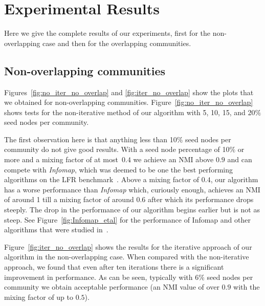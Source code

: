 \section{Experimental Results}
\newcommand{\appplotwidth}{\linewidth}
\newcommand{\appcfinderwidth}{\linewidth}

Here we give the complete results of our experiments, first for the non-overlapping case and then for the overlapping communities.

\subsection{Non-overlapping communities}
Figures~\ref{fig:no_iter_no_overlap} and \ref{fig:iter_no_overlap} %
show the plots that we obtained for non-overlapping communities. Figure~\ref{fig:no_iter_no_overlap}
shows tests for the non-iterative method of our algorithm with 5, 10, 15, and 20$\%$ seed nodes per 
community. 

The first observation here is that anything less than 10$\%$ seed nodes per community 
do not give good results. With a seed node percentage of 10$\%$ or more and 
a mixing factor of at most~$0.4$ we achieve an NMI above $0.9$ and can compete with \textit{Infomap}, 
which was deemed to be one the best performing algorithms on the LFR benchmark~\cite{LF09}. 
Above a mixing factor of $0.4$, our algorithm has a worse performance than \textit{Infomap} 
which, curiously enough, achieves an NMI of around 1 till a mixing factor of around 
$0.6$ after which its performance drops steeply. The drop in the performance of our algorithm 
begins earlier but is not as steep. See Figure~\ref{fig:Infomap_etal} for the performance 
of Infomap and other algorithms that were studied in~\cite{LF09}. 

Figure~\ref{fig:iter_no_overlap} shows the results for the iterative approach of 
our algorithm in the non-overlapping case. When compared with the non-iterative approach, 
we found that even after ten iterations there is a significant improvement in 
performance. %
As can be seen, typically with 6$\%$ seed nodes per community we obtain 
acceptable performance (an NMI value of over $0.9$ with the mixing factor 
of up to $0.5$).  


